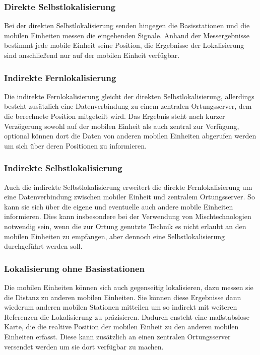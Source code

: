 \subsubsection{Direkte Selbstlokalisierung} 
Bei der direkten Selbstlokalisierung senden hingegen die Basisstationen und die mobilen Einheiten messen die eingehenden Signale. Anhand der Messergebnisse bestimmt jede mobile Einheit seine Position, die Ergebnisse der Lokalisierung sind anschließend nur auf der mobilen Einheit verfügbar. \\

\subsubsection{Indirekte Fernlokalisierung} 
Die indirekte Fernlokalisierung gleicht der direkten Selbstlokalisierung, allerdings besteht zusätzlich eine Datenverbindung zu einem zentralen Ortungsserver, dem die berechnete Position mitgeteilt wird. Das Ergebnis steht nach kurzer Verzögerung sowohl auf der mobilen Einheit als auch zentral zur Verfügung, optional können dort die Daten von anderen mobilen Einheiten abgerufen werden um sich über deren Positionen zu informieren. \\

\subsubsection{Indirekte Selbstlokalisierung} 
Auch die indirekte Selbstlokalisierung erweitert die direkte Fernlokalisierung um eine Datenverbindung zwischen mobiler Einheit und zentralem Ortungsserver. 
So kann sie sich über die eigene und eventuelle auch andere mobile Einheiten informieren. 
Dies kann insbesondere bei der Verwendung von Mischtechnologien notwendig sein, wenn die zur Ortung genutzte Technik es nicht erlaubt an den mobilen Einheiten zu empfangen, aber dennoch eine Selbstlokalisierung durchgeführt werden soll.

\subsubsection{Lokalisierung ohne Basisstationen} 
Die mobilen Einheiten können sich auch gegenseitig lokalisieren, dazu messen sie die Distanz zu anderen mobilen Einheiten.
Sie können diese Ergebnisse dann wiederum anderen mobilen Stationen mitteilen um so indirekt mit weiteren Referenzen die Lokalisierung zu präzisieren. 
Dadurch ensteht eine maßstabslose Karte, die die realtive Position der mobilen Einheit zu den anderen mobilen Einheiten erfasst.
Diese kann zusätzlich an einen zentralen Ortungsserver versendet werden um sie dort verfügbar zu machen.

